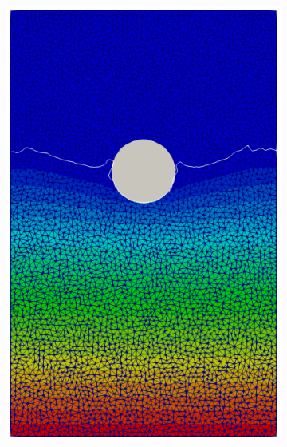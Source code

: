 \documentclass[final,3p,times]{elsarticle}
\begin{document}
\begin{figure}[H]
\begin{subfigure}{0.38\columnwidth}
		\includegraphics[width=1.0\textwidth]{Images/CD_FEM.png}
	\end{subfigure}
	\begin{subfigure}{0.15\columnwidth}	
		\centering

\end{subfigure}
\end{figure}
\end{document}
